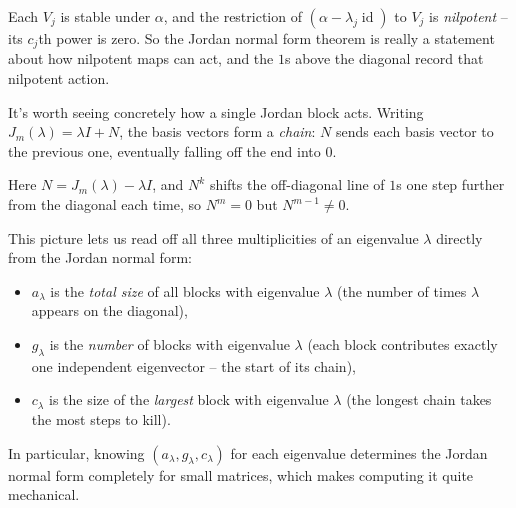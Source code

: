 \begin{remark}
    Each $V_j$ is stable under $\alpha$, and the restriction of $(\alpha - \lambda_j \operatorname{id})$ to $V_j$ is \emph{nilpotent} -- its $c_j$th power is zero. So the Jordan normal form theorem is really a statement about how nilpotent maps can act, and the $1$s above the diagonal record that nilpotent action.
\end{remark}

It's worth seeing concretely how a single Jordan block acts. Writing $J_m(\lambda) = \lambda I + N$, the basis vectors form a \emph{chain}: $N$ sends each basis vector to the previous one, eventually falling off the end into $0$.
\begin{center}
\end{center}
Here $N = J_m(\lambda) - \lambda I$, and $N^k$ shifts the off-diagonal line of $1$s one step further from the diagonal each time, so $N^m = 0$ but $N^{m-1} \neq 0$.

This picture lets us read off all three multiplicities of an eigenvalue $\lambda$ directly from the Jordan normal form:
\begin{itemize}
    \item $a_\lambda$ is the \emph{total size} of all blocks with eigenvalue $\lambda$ (the number of times $\lambda$ appears on the diagonal),
    \item $g_\lambda$ is the \emph{number} of blocks with eigenvalue $\lambda$ (each block contributes exactly one independent eigenvector -- the start of its chain),
    \item $c_\lambda$ is the size of the \emph{largest} block with eigenvalue $\lambda$ (the longest chain takes the most steps to kill).
\end{itemize}
In particular, knowing $(a_\lambda, g_\lambda, c_\lambda)$ for each eigenvalue determines the Jordan normal form completely for small matrices, which makes computing it quite mechanical.

